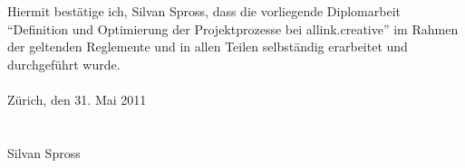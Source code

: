 Hiermit bestätige ich, Silvan Spross, dass die vorliegende Diplomarbeit 
``Definition und Optimierung der Projektprozesse bei allink.creative'' im
Rahmen der geltenden Reglemente und in allen Teilen selbständig erarbeitet und 
durchgeführt wurde.\\
\\
Zürich, den 31. Mai 2011\\
\\\\
Silvan Spross